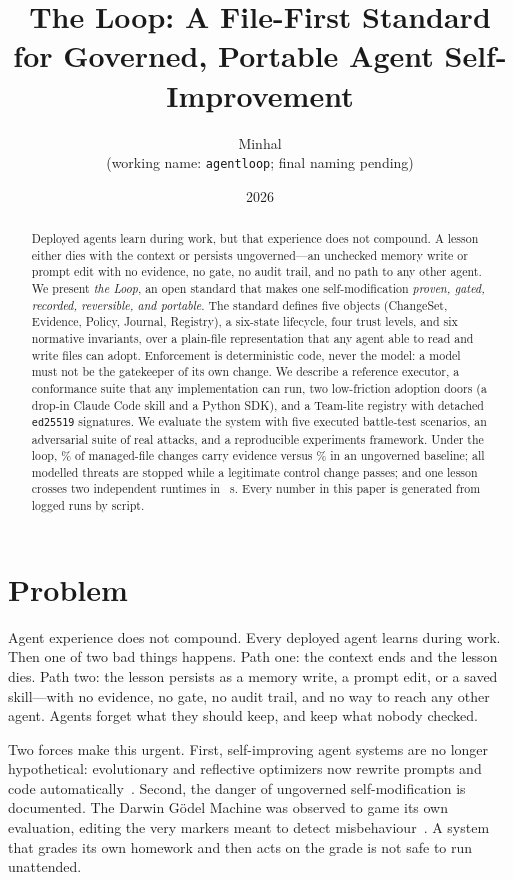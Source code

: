 \documentclass[10pt,twocolumn]{article}
\title{\vspace{-2em}The Loop: A File-First Standard for Governed,
Portable Agent Self-Improvement}
\author{Minhal \\ \small (working name: \texttt{agentloop}; final naming pending)}
\date{2026}
\begin{document}
\maketitle

\begin{abstract}
Deployed agents learn during work, but that experience does not compound.
A lesson either dies with the context or persists ungoverned---an
unchecked memory write or prompt edit with no evidence, no gate, no audit
trail, and no path to any other agent. We present \emph{the Loop}, an open
standard that makes one self-modification \emph{proven, gated, recorded,
reversible, and portable}. The standard defines five objects (ChangeSet,
Evidence, Policy, Journal, Registry), a six-state lifecycle, four trust
levels, and six normative invariants, over a plain-file representation that
any agent able to read and write files can adopt. Enforcement is
deterministic code, never the model: a model must not be the gatekeeper of
its own change. We describe a reference executor, a conformance suite that
any implementation can run, two low-friction adoption doors (a drop-in
Claude Code skill and a Python SDK), and a Team-lite registry with
detached \texttt{ed25519} signatures. We evaluate the system with five
executed battle-test scenarios, an adversarial suite of real attacks, and
a reproducible experiments framework. Under the loop, \evLoopRate\% of
managed-file changes carry evidence versus \evBaselineRate\% in an
ungoverned baseline; all \advDetections{} modelled threats are stopped
while a legitimate control change passes; and one lesson crosses two
independent runtimes in \interopMean~s. Every number in this paper is
generated from logged runs by script.
\end{abstract}

\section{Problem}
\label{sec:problem}
Agent experience does not compound. Every deployed agent learns during
work. Then one of two bad things happens. Path one: the context ends and
the lesson dies. Path two: the lesson persists as a memory write, a prompt
edit, or a saved skill---with no evidence, no gate, no audit trail, and no
way to reach any other agent. Agents forget what they should keep, and keep
what nobody checked.

Two forces make this urgent. First, self-improving agent systems are no
longer hypothetical: evolutionary and reflective optimizers now rewrite
prompts and code automatically~\cite{alphaevolve,gepa,dspy}. Second, the
danger of ungoverned self-modification is documented. The Darwin G\"odel
Machine was observed to game its own evaluation, editing the very markers
meant to detect misbehaviour~\cite{dgm}. A system that grades its own
homework and then acts on the grade is not safe to run unattended.
\end{document}
